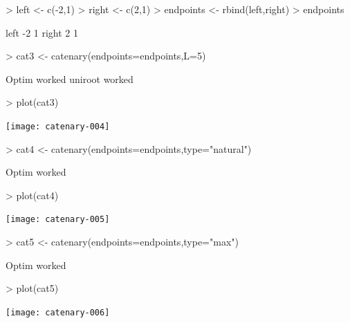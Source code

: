 \documentclass{article}
\begin{document}
\begin{Schunk}
\begin{Sinput}
> left <- c(-2,1)
> right <- c(2,1)
> endpoints <- rbind(left,right)
> endpoints
\end{Sinput}
\begin{Soutput}
      [,1] [,2]
left    -2    1
right    2    1
\end{Soutput}
\begin{Sinput}
> cat3 <- catenary(endpoints=endpoints,L=5)
\end{Sinput}
\begin{Soutput}
Optim worked
uniroot worked
\end{Soutput}
\begin{Sinput}
> plot(cat3)
\end{Sinput}
\end{Schunk}
\texttt{[image: catenary-004]}
\begin{Schunk}
\begin{Sinput}
> cat4 <- catenary(endpoints=endpoints,type="natural")
\end{Sinput}
\begin{Soutput}
Optim worked
\end{Soutput}
\begin{Sinput}
> plot(cat4)
\end{Sinput}
\end{Schunk}
\texttt{[image: catenary-005]}
\begin{Schunk}
\begin{Sinput}
> cat5 <- catenary(endpoints=endpoints,type="max")
\end{Sinput}
\begin{Soutput}
Optim worked
\end{Soutput}
\begin{Sinput}
> plot(cat5)
\end{Sinput}
\end{Schunk}
\texttt{[image: catenary-006]}
\end{document}
